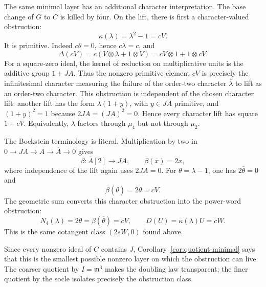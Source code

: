 \documentclass[11pt]{amsart}
\theoremstyle{definition}
\theoremstyle{remark}
\newcommand{\m}{\mathfrak m}
\newcommand{\ot}{\otimes}
\begin{document}
The same minimal layer has an additional character interpretation.  The
base change of \(G\) to \(\overline C\) is killed by four.  On the lift,
there is first a character-valued obstruction:
\begin{equation}\label{eq:infinitesimal-character}
 \kappa(\lambda)=\lambda^2-1=cV.
\end{equation}
It is primitive.  Indeed \(c\theta=0\), hence \(c\lambda=c\), and
\begin{equation}\label{eq:cV-primitive}
 \Delta(cV)
 =c(V\ot\lambda+1\ot V)
 =cV\ot1+1\ot cV.
\end{equation}
For a square-zero ideal, the kernel of reduction on multiplicative units is
the additive group \(1+JA\).  Thus the nonzero primitive element \(cV\)
is precisely the infinitesimal character measuring the failure of the
order-two character \(\overline\lambda\) to lift as an order-two character.
This obstruction is independent of the chosen character lift: another
lift has the form \(\lambda(1+y)\), with \(y\in JA\) primitive, and
\((1+y)^2=1\) because \(2JA=(JA)^2=0\).  Hence every character lift has
square \(1+cV\).  Equivalently, \(\lambda\) factors through \(\mu_4\) but
not through \(\mu_2\).

The Bockstein terminology is literal.  Multiplication by two in
\(0\to JA\to A\to\overline A\to0\) gives
\begin{equation}\label{eq:literal-bockstein}
 \beta\colon \overline A[2]\longrightarrow JA,
 \qquad
 \beta(\overline x)=2x,
\end{equation}
where independence of the lift again uses \(2JA=0\).  For
\(\theta=\lambda-1\), one has \(2\overline\theta=0\) and
\begin{equation}\label{eq:theta-bockstein}
 \beta(\overline\theta)=2\theta=cV.
\end{equation}
The geometric sum converts this character obstruction into the power-word
obstruction:
\begin{equation}\label{eq:character-to-word-obstruction}
 N_4(\lambda)=2\theta=\beta(\overline\theta)=cV,
 \qquad
 D(U)=\kappa(\lambda)U=cW.
\end{equation}
This is the same cotangent class \((2sW,0)\) found above.

Since every nonzero ideal of \(C\) contains \(J\),
Corollary~\ref{cor:quotient-minimal} says that this is the smallest possible
nonzero layer on which the obstruction can live.  The coarser quotient by
\(I=\m^3\) makes the doubling law transparent; the finer quotient by the
socle isolates precisely the obstruction class.
\end{document}
